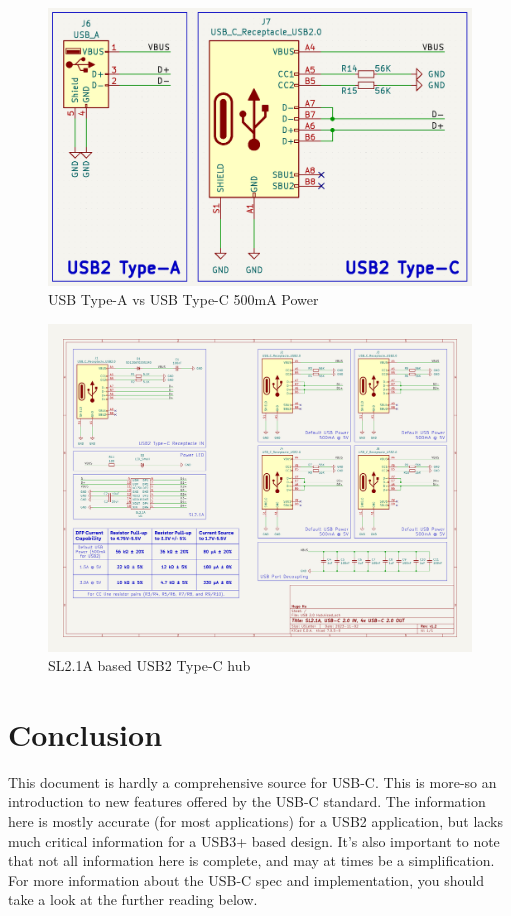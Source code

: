 \documentclass[12pt]{article}
\begin{document}
\newpage
\begin{figure}[h]
	\centering
	\includegraphics[width=\linewidth]{images/USBAtoUSBC.png}
	\caption{USB Type-A vs USB Type-C 500mA Power}
	\label{fig:usbconversion}
\end{figure}

\begin{figure}[h]
	\centering
	\includegraphics[width=\linewidth]{images/SL2.1A.png}
	\caption{SL2.1A based USB2 Type-C hub\protect\footnotemark}
	\label{fig:sl21a}
\end{figure}

\newpage
\section{Conclusion}
\noindent
This document is hardly a comprehensive source for USB-C. This is more-so an introduction to new features offered by the USB-C standard. The information here is mostly accurate (for most applications) for a USB2 application, but lacks much critical information for a USB3+ based design. It's also important to note that not all information here is complete, and may at times be a simplification. 
For more information about the USB-C spec and implementation, you should take a look at the further reading below. 
\end{document}
